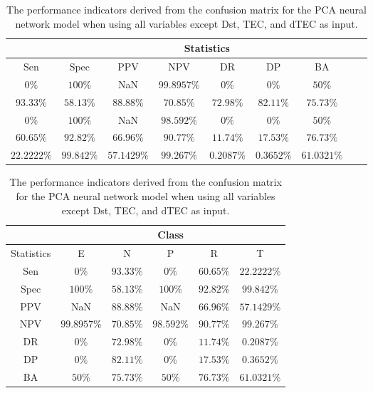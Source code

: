 \begin{table}[!ht]
	\centering
	\begin{tabular}{|c|c|c|c|c|c|c|c|c|}
		\hline
		 & \multicolumn{7}{c|}{Statistics} \\ \hline
		Sen & Spec & PPV & NPV & DR & DP & BA \\ \hline
		$0\%$ & $100\%$ & NaN & $99.8957\%$ & $0\%$ & $0\%$ & $50\%$ \\ \hline
		$93.33\%$ & $58.13\%$ & $88.88\%$ & $70.85\%$ & $72.98\%$ & $82.11\%$ & $75.73\%$ \\ \hline
		$0\%$ & $100\%$ & NaN & $98.592\%$ & $0\%$ & $0\%$ & $50\%$ \\ \hline
		$60.65\%$ & $92.82\%$ & $66.96\%$ & $90.77\%$ & $11.74\%$ & $17.53\%$ & $76.73\%$ \\ \hline
		$22.2222\%$ & $99.842\%$ & $57.1429\%$ & $99.267\%$ & $0.2087\%$ & $0.3652\%$ & $61.0321\%$ \\ \hline
	\end{tabular}
	\caption{The performance indicators derived from the confusion matrix for the PCA neural network model when using all variables except Dst, TEC, and dTEC as input.}
	\label{tab:cs:noTEC:pcaNNet}
\end{table}

\begin{table}[!ht]
	\centering
	\begin{tabular}{|c|c|c|c|c|c|}
		\hline
		 & \multicolumn{5}{c|}{Class} \\ \hline
		Statistics & E & N & P & R & T \\ \hline
		Sen & $0\%$ & $93.33\%$ & $0\%$ & $60.65\%$ & $22.2222\%$ \\ \hline
		Spec & $100\%$ & $58.13\%$ & $100\%$ & $92.82\%$ & $99.842\%$ \\ \hline
		PPV & NaN & $88.88\%$ & NaN & $66.96\%$ & $57.1429\%$ \\ \hline
		NPV & $99.8957\%$ & $70.85\%$ & $98.592\%$ & $90.77\%$ & $99.267\%$ \\ \hline
		DR & $0\%$ & $72.98\%$ & $0\%$ & $11.74\%$ & $0.2087\%$ \\ \hline
		DP & $0\%$ & $82.11\%$ & $0\%$ & $17.53\%$ & $0.3652\%$ \\ \hline
		BA & $50\%$ & $75.73\%$ & $50\%$ & $76.73\%$ & $61.0321\%$ \\ \hline
	\end{tabular}
	\caption{The performance indicators derived from the confusion matrix for the PCA neural network model when using all variables except Dst, TEC, and dTEC as input.}
	\label{tab:cs:reverse:noTEC:pcaNNet}
\end{table}
